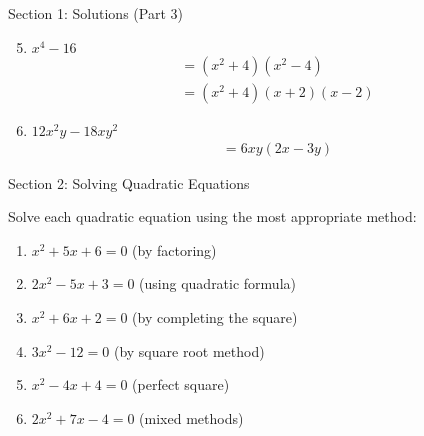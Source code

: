 \documentclass[aspectratio=169]{beamer}
\begin{document}
\begin{frame}{Section 1: Solutions (Part 3)}
    \begin{tcolorbox}[colback=lightgray,colframe=accent,title=Detailed Solutions (Continued)]
        \footnotesize
        \begin{enumerate}
            \setcounter{enumi}{4}
            \item $x^4 - 16$
            \begin{align*}
                &= (x^2 + 4)(x^2 - 4) \\
                &= (x^2 + 4)(x + 2)(x - 2)
            \end{align*}
            
            \item $12x^2y - 18xy^2$
            \begin{align*}
                &= 6xy(2x - 3y)
            \end{align*}
        \end{enumerate}
    \end{tcolorbox}
\end{frame}

\begin{frame}{Section 2: Solving Quadratic Equations}
    \begin{tcolorbox}[colback=lightgray,colframe=primary,title=Practice Problems]
        \footnotesize
        Solve each quadratic equation using the most appropriate method:
        \begin{enumerate}
            \setlength{\itemsep}{0.5em}
            \item $x^2 + 5x + 6 = 0$ (by factoring)
            \item $2x^2 - 5x + 3 = 0$ (using quadratic formula)
            \item $x^2 + 6x + 2 = 0$ (by completing the square)
            \item $3x^2 - 12 = 0$ (by square root method)
            \item $x^2 - 4x + 4 = 0$ (perfect square)
            \item $2x^2 + 7x - 4 = 0$ (mixed methods)
        \end{enumerate}
    \end{tcolorbox}
\end{frame}
\end{document}
